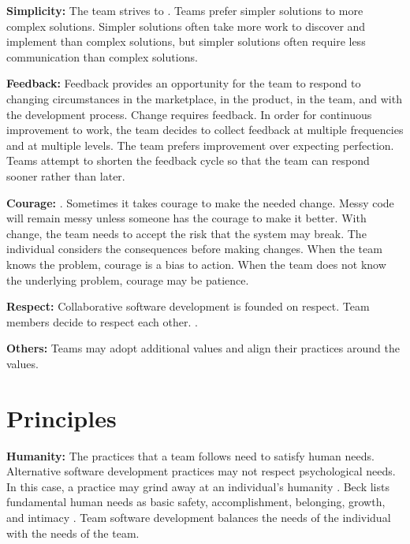 \textbf{Simplicity:} The team strives to  \cite{BeckExtremeProgramming2004}. Teams prefer simpler solutions to more complex solutions. Simpler solutions often take more work to discover and implement than complex solutions, but simpler solutions often require less communication than complex solutions.










\textbf{Feedback:} Feedback provides an opportunity for the team to respond to changing circumstances in the marketplace, in the product, in the team, and with the development process. Change requires feedback. In order for continuous improvement to work, the team decides to collect feedback at multiple frequencies and at multiple levels. The team prefers improvement over expecting perfection. Teams attempt to shorten the feedback cycle so that the team can respond sooner rather than later.


\textbf{Courage:}    \cite{BeckExtremeProgramming2004}. Sometimes it takes courage to make the needed change. Messy code will remain messy unless someone has the courage to make it better. With change, the team needs to accept the risk that the system may break. The individual considers the consequences before making changes. When the team knows the problem, courage is a bias to action. When the team does not know the underlying problem, courage may be patience. 


\textbf{Respect:} Collaborative software development is founded on respect. Team members decide to respect each other.  \cite{BeckExtremeProgramming2004}.


\textbf{Others:} Teams may adopt additional values and align their practices around the values. 


\section{Principles}
\textbf{Humanity:} The practices that a team follows need to satisfy human needs. Alternative software development practices may not respect psychological needs. In this case, a practice may grind away at an individual's humanity \cite{BeckExtremeProgramming2004}. Beck lists fundamental human needs as basic safety, accomplishment, belonging, growth, and intimacy \cite{BeckExtremeProgramming2004}. Team software development balances the needs of the individual with the needs of the team. 



